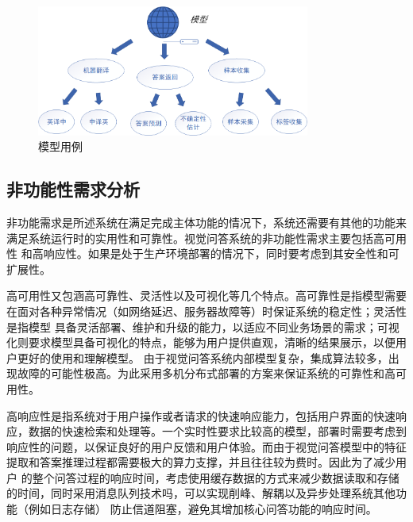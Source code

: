 \begin{enumerate}[topsep = 0 pt, itemsep= 0 pt, parsep=0pt, partopsep=0pt, leftmargin=44pt, itemindent=0pt, labelsep=6pt, label=(\arabic*)]
\begin{figure}[htbp]
        \includegraphics[width=0.8\textwidth]{Fig/myfig/chapter5/eg_model.png}  %
        \caption{\label{eg_model}模型用例} 
    \end{figure}
\end{enumerate}

\subsection{非功能性需求分析}
非功能需求是所述系统在满足完成主体功能的情况下，系统还需要有其他的功能来满足系统运行时的实用性和可靠性。视觉问答系统的非功能性需求主要包括高可用性
和高响应性。如果是处于生产环境部署的情况下，同时要考虑到其安全性和可扩展性。

高可用性又包涵高可靠性、灵活性以及可视化等几个特点。高可靠性是指模型需要在面对各种异常情况（如网络延迟、服务器故障等）时保证系统的稳定性；灵活性是指模型
具备灵活部署、维护和升级的能力，以适应不同业务场景的需求；可视化则要求模型具备可视化的特点，能够为用户提供直观，清晰的结果展示，以便用户更好的使用和理解模型。
由于视觉问答系统内部模型复杂，集成算法较多，出现故障的可能性极高。为此采用多机分布式部署的方案来保证系统的可靠性和高可用性。

高响应性是指系统对于用户操作或者请求的快速响应能力，包括用户界面的快速响应，数据的快速检索和处理等。一个实时性要求比较高的模型，部署时需要考虑到
响应性的问题，以保证良好的用户反馈和用户体验。而由于视觉问答模型中的特征提取和答案推理过程都需要极大的算力支撑，并且往往较为费时。因此为了减少用户
的整个问答过程的响应时间，考虑使用缓存数据的方式来减少数据读取和存储的时间，同时采用消息队列技术吗，可以实现削峰、解耦以及异步处理系统其他功能（例如日志存储）
防止信道阻塞，避免其增加核心问答功能的响应时间。

